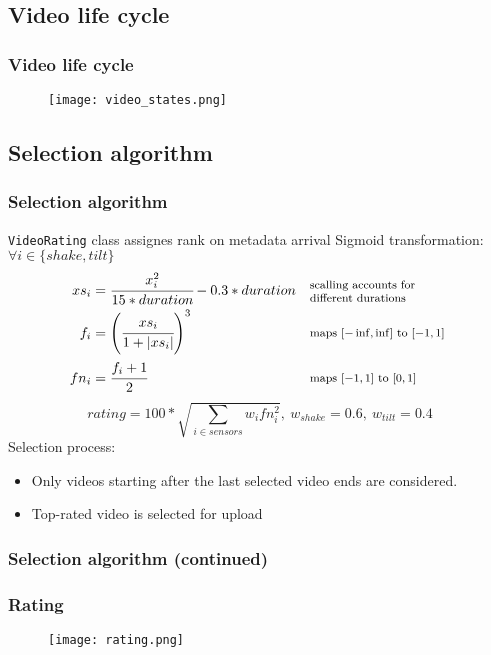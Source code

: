 \subsection{Video life cycle}
\begin{frame}[fragile]	
	\frametitle{Video life cycle}
	\begin{figure}[!t]
		\centering
		\texttt{[image: video\_states.png]}
		\label{fig:states}
	\end{figure}
\end{frame}

\subsection{Selection algorithm}
\begin{frame}	
	\frametitle{Selection algorithm}
	\texttt{VideoRating} class assignes rank on metadata arrival
	Sigmoid transformation: $\forall i \in \{shake, tilt\}$
	\begin{align*}
		xs_i &= \cfrac{x_i^2}{15 * duration} - 0.3 * duration 
			&&\parbox{10em}{\footnotesize scalling accounts for \\ different durations}\\
		f_i  &= \left(\cfrac{xs_i}{1+|xs_i|}\right)^3
			&& \parbox{10em}{\footnotesize maps $[-\inf,\inf]$ to $[-1, 1]$}\\
		fn_i &= \cfrac{f_i + 1}{2}
			&& \parbox{10em}{\footnotesize maps $[-1,1]$ to $[0,1]$}
	\end{align*}
	$$rating = 100 * \sqrt{ \sum\limits_{i \in sensors}{w_i fn_i^2} },\ w_{shake} = 0.6,\ w_{tilt} = 0.4$$
	Selection process:
	\begin{itemize}
		\item Only videos starting after the last selected video ends are considered.
		\item Top-rated video is selected for upload
	\end{itemize}
\end{frame}

\begin{frame}	
	\frametitle{Selection algorithm (continued)}
	\begin{figure}[!t]
		\centering
		\hfill
	\end{figure}
\end{frame}

\begin{frame}	
	\frametitle{Rating}
	\begin{figure}[!t]
		\centering
		\texttt{[image: rating.png]}
		\label{fig:rating}
	\end{figure}
\end{frame}